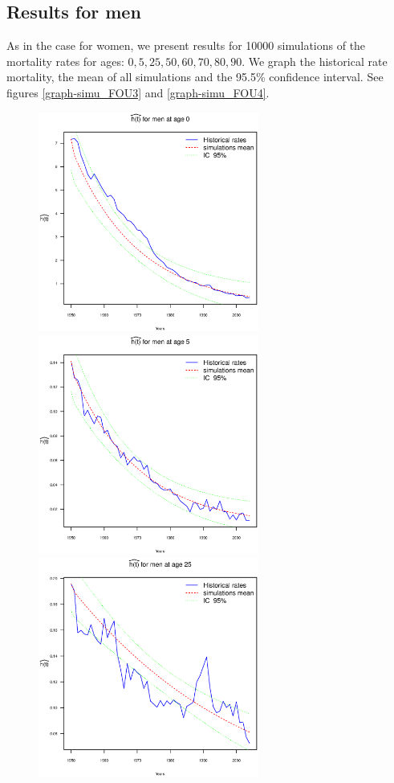 \documentclass[smallextended]{svjour3}
\begin{document}
\subsection{Results for men}\label{re-men}

As in the case for women, we present results for 10000 simulations of the
mortality rates for ages: $0,5,25,50,60,70,80,90$.
We graph the historical rate mortality, the mean of all simulations and the
95.5\% confidence interval. See figures \ref{graph-simu_FOU3} and
\ref{graph-simu_FOU4}.\\



\begin{figure}[H]
    \includegraphics[width = 2.85in]{PlotMen0.eps}
    \includegraphics[width = 2.85in]{PlotMen5.eps}
    \includegraphics[width = 2.85in]{PlotMen25.eps}

\end{figure}
\end{document}
